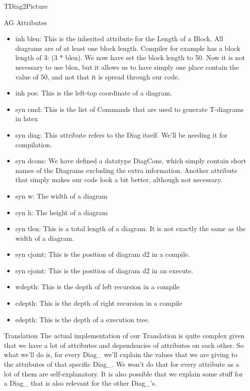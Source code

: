 \documentclass{article}
\begin{document}
\begin{subsection}{TDiag2Picture}
\begin{subsubsection}{AG Attributes}
\begin{itemize}
	\item inh blen: This is the inherited attribute for the Length of a Block. All diagrams are of at least one block length. Compiler for example has a block length of 3: (3 * blen). We now have set the block length to 50. Now it is not necessary to use blen, but it allows us to have simply one place contain the value of 50, and not that it is spread through our code. 
	\item inh pos: This is the left-top coordinate of a diagram.
	\item syn cmd: This is the list of Commands that are used to generate T-diagrams in latex
	\item syn diag: This attribute refers to the Diag itself. We'll be needing it for compilation.
	\item syn dcons: We have defined a datatype DiagCons, which simply contain short names of the Diagrams excluding the extra information. Another attribute that simply makes our code look a bit better, although not necessary.
	\item syn w: The width of a diagram
	\item syn h: The height of a diagram
	\item syn tlen: This is a total length of a diagram. It is not exactly the same as the width of a diagram. 
	\item syn cjoint: This is the position of diagram d2 in a compile.
	\item syn ejoint: This is the position of diagram d2 in an execute.
	\item wdepth: This is the depth of left recursion in a compile
	\item cdepth: This is the depth of right recursion in a compile
	\item edepth: This is the depth of a execution tree. 
\end{itemize}
\end{subsubsection}
\begin{subsubsection}{Translation}
The actual implementation of our Translation is quite complex given that we have a lot of attributes and dependencies of attributes on each other. So what we'll do is, for every Diag\_ we'll explain the values that we are giving to the attributes of that specific Diag\_.
We won't do that for every attribute as a lot of them are self-explanatory. It is also possible that we explain some stuff for a Diag\_ that is also relevant for the other Diag\_'s.


\end{subsubsection}
\end{subsection}
\end{document}
